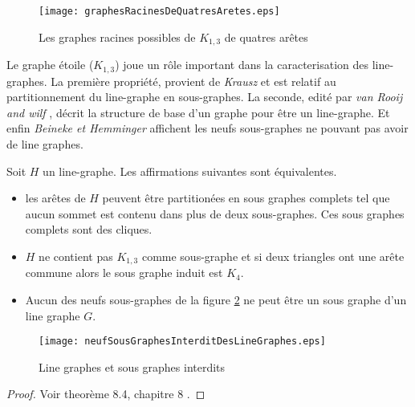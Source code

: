 \begin{figure}[htb!]\vspace{-0.5em}
	\centering
	\texttt{[image: graphesRacinesDeQuatresAretes.eps]}\vspace{-0.5em}
	\caption{ Les graphes racines possibles de $K_{1,3}$ de quatres ar\^etes   }\vspace{-0.5em}
	\label{graphesRacinesDeQuatresAretes}
\end{figure}

Le graphe \'etoile ($K_{1,3}$) joue un r\^ole important dans la caracterisation des line-graphes.
La premi\`ere propri\'et\'e, provient de {\em Krausz} \cite{krausz1943demonstration} et est relatif au partitionnement du line-graphe en sous-graphes. La seconde, edit\'e par {\em van Rooij and wilf} \cite{ROOIJetWILF1965interchange}, d\'ecrit la structure de base d'un graphe pour \^etre un line-graphe. Et enfin {\em Beineke\cite{beineke1968derived} et Hemminger}   affichent les neufs sous-graphes ne pouvant pas avoir de line graphes. 
\begin{theorem}
\label{caracteristiquesLinegraphes}
Soit $H$ un line-graphe. Les affirmations suivantes sont \'equivalentes.
\begin{itemize}
	\item les ar\^etes de $H$ peuvent \^etre partition\'ees en sous graphes complets tel que aucun sommet est contenu dans plus de deux sous-graphes. Ces sous graphes complets sont des cliques.
	\item $H$ ne contient pas $K_{1,3}$ comme sous-graphe et si deux triangles ont une ar\^ete commune alors le sous graphe induit est $K_4$.
	\item Aucun des neufs sous-graphes de la figure \ref{neufSousGraphesInterditDesLineGraphes} ne peut \^etre un sous graphe d'un line graphe $G$.
\end{itemize}
\end{theorem}

\begin{figure}[htb!]\vspace{-0.5em}
	\centering
	\texttt{[image: neufSousGraphesInterditDesLineGraphes.eps]}\vspace{-0.5em}
	\caption{ Line graphes et sous graphes interdits }\vspace{-0.5em}
	\label{neufSousGraphesInterditDesLineGraphes}
\end{figure}

\begin{proof}
Voir theor\`eme 8.4, chapitre 8 \cite{lineGraphe}.
\end{proof}
